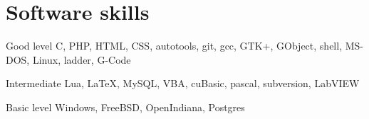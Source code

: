 \documentclass{tccv}
\begin{document}
\section{Software skills}

\begin{factlist}

\item{Good level}
     {C, PHP, HTML, CSS, autotools, git, gcc, GTK+, GObject, shell,
      MS-DOS, Linux, ladder, G-Code}

\item{Intermediate}
     {Lua, \LaTeX, MySQL, VBA, cuBasic, pascal, subversion, LabVIEW}

\item{Basic level}
     {Windows, FreeBSD, OpenIndiana, Postgres}

\end{factlist}
\end{document}
